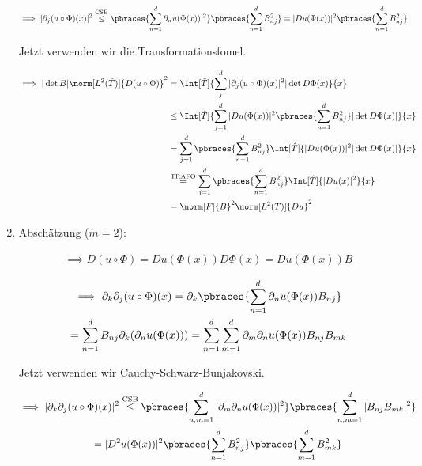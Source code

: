 \begin{solution}
\begin{enumerate}[label = \arabic*.]
  \begin{align*}
    \implies
    |\partial_j (u \circ \Phi)(x)|^2
    & \stackrel
    {
      \mathrm{CSB}
    }
    {\leq}
    \pbraces
    {
      \sum_{n=1}^d
      \partial_n u(\Phi(x))|^2
    }
    \pbraces
    {
      \sum_{n=1}^d
      B_{nj}^2
    }
    =
    |Du(\Phi(x))|^2
    \pbraces
    {
      \sum_{n=1}^d
      B_{nj}^2
    }
    \end{align*}

  Jetzt verwenden wir die Transformationsfomel.

  \begin{align*}
    \implies
    |\det B| \norm[L^2(\hat T)]{D(u \circ \Phi)}^2
    & =
    \Int[\hat T]
    {
      \sum_j^d
      |\partial_j (u \circ \Phi)(x)|^2
      |\det D \Phi(x)
    }{x} \\
    & \leq
    \Int[\hat T]
    {
      \sum_{j=1}^d
      |Du(\Phi(x))|^2
      \pbraces
      {
        \sum_{n=1}^d
        B_{nj}^2
      }
      |\det D \Phi(x)|
    }{x} \\
    & =
    \sum_{j=1}^d
    \pbraces
    {
      \sum_{n=1}^d
      B_{nj}^2
    }
    \Int[\hat T]
    {
      |Du(\Phi(x))|^2
      |\det D \Phi(x)|
      }{x} \\
    & \stackrel
    {
      \mathrm{TRAFO}
    }{=}
    \sum_{j=1}^d
    \pbraces
    {
      \sum_{n=1}^d
      B_{nj}^2
    }
    \Int[\hat T]
    {
      |Du(x)|^2
    }{x} \\
    & =
    \norm[F]{B}^2 \norm[L^2(T)]{Du}^2
  \end{align*}

  \item Abschätzung ($m = 2$):

  \begin{align*}
    \implies
    D(u \circ \Phi) = Du(\Phi(x))D\Phi(x) = Du(\Phi(x))B
  \end{align*}

  \begin{multline*}
    \implies
    \partial_k \partial_j (u \circ \Phi)(x)
    =
    \partial_k \pbraces
    {
      \sum_{n=1}^d
      \partial_n u(\Phi(x)) B_{nj}
    } \\
    =
    \sum_{n=1}^d
    B_{nj} \partial_k (\partial_n u(\Phi(x)))
    =
    \sum_{n=1}^d
    \sum_{m=1}^d
    \partial_m \partial_n u(\Phi(x)) B_{nj} B_{mk}
  \end{multline*}

  Jetzt verwenden wir Cauchy-Schwarz-Bunjakovski.

  \begin{multline*}
    \implies
    |\partial_k \partial_j (u \circ \Phi)(x)|^2
    \stackrel
    {
      \mathrm{CSB}
    }
    {\leq}
    \pbraces
    {
      \sum_{n,m=1}^d
      |\partial_m \partial_n u(\Phi(x))|^2
    }
    \pbraces
    {
      \sum_{n,m=1}^d |B_{nj} B_{mk}|^2
    } \\
    =
    |D^2 u(\Phi(x))|^2
    \pbraces
    {
      \sum_{n=1}^d
      B_{nj}^2
    }
    \pbraces
    {
      \sum_{m=1}^d
      B_{mk}^2
    }
  \end{multline*}


\end{enumerate}
\end{solution}
